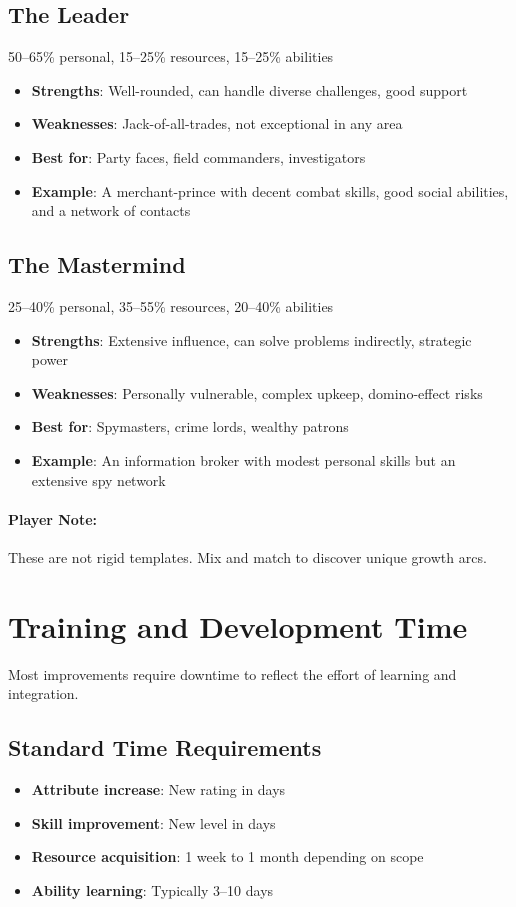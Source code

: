\begin{multicols}{2}
\subsection*{The Leader}
50–65\% personal, 15–25\% resources, 15–25\% abilities
\begin{itemize}
\item \textbf{Strengths}: Well-rounded, can handle diverse challenges, good support
\item \textbf{Weaknesses}: Jack-of-all-trades, not exceptional in any area
\item \textbf{Best for}: Party faces, field commanders, investigators
\item \textbf{Example}: A merchant-prince with decent combat skills, good social abilities, and a network of contacts
\end{itemize}

\subsection*{The Mastermind}
25–40\% personal, 35–55\% resources, 20–40\% abilities
\begin{itemize}
\item \textbf{Strengths}: Extensive influence, can solve problems indirectly, strategic power
\item \textbf{Weaknesses}: Personally vulnerable, complex upkeep, domino-effect risks
\item \textbf{Best for}: Spymasters, crime lords, wealthy patrons
\item \textbf{Example}: An information broker with modest personal skills but an extensive spy network
\end{itemize}

\paragraph{Player Note:} These are not rigid templates. Mix and match to discover unique growth arcs.

\section{Training and Development Time}

Most improvements require downtime to reflect the effort of learning and integration.

\subsection*{Standard Time Requirements}
\begin{itemize}
\item \textbf{Attribute increase}: New rating in days
\item \textbf{Skill improvement}: New level in days
\item \textbf{Resource acquisition}: 1 week to 1 month depending on scope
\item \textbf{Ability learning}: Typically 3–10 days
\end{itemize}


\end{multicols}
